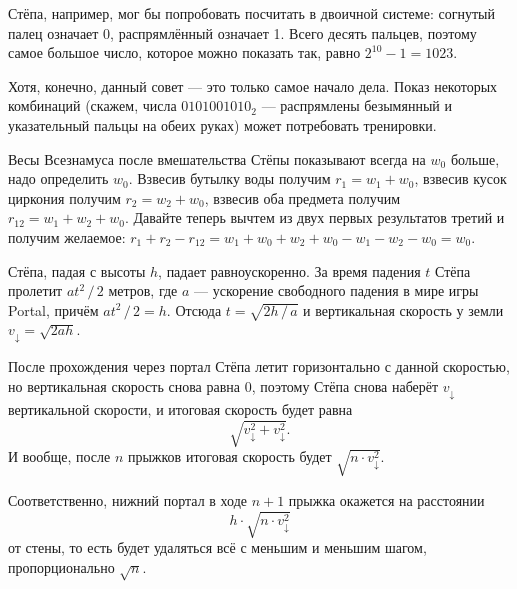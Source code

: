 \begin{itemize}
\itA Стёпа, например, мог бы попробовать посчитать в двоичной системе:
согнутый палец означает 0, распрямлённый означает 1. Всего десять пальцев,
поэтому самое большое число, которое можно показать так, равно $2^{10}-1 = 1023$.

Хотя, конечно, данный совет --- это только самое начало дела. Показ некоторых
комбинаций (скажем, числа $0101001010_2$ --- распрямлены безымянный и указательный
пальцы на обеих руках) может потребовать тренировки.


\itB Весы Всезнамуса после вмешательства Стёпы показывают всегда на $w_0$ больше, надо определить $w_0$.
Взвесив бутылку воды получим $r_1 = w_1 + w_0$, взвесив кусок циркония получим $r_2 = w_2 + w_0$,
взвесив оба предмета получим $r_{12} = w_1 + w_2 + w_0$. Давайте теперь вычтем из двух 
первых результатов третий и получим желаемое: 
$r_1 + r_2 - r_{12} = w_1 + w_0 + w_2 + w_0 - w_1 - w_2 - w_0 = w_0$.

\itC Стёпа, падая с высоты $h$, падает равноускоренно. За время падения $t$ Стёпа пролетит 
$at^2\,/\,2$ метров, где $a$ --- ускорение свободного падения в мире игры Portal, 
причём $at^2\,/\,2 = h$. Отсюда $t = \sqrt{2h\,/\,a}$ и вертикальная скорость
у земли $v_\downarrow = \sqrt{2ah}$.

После прохождения через портал Стёпа летит горизонтально с данной скоростью, но вертикальная
скорость снова равна 0, поэтому Стёпа снова наберёт $v_\downarrow$ вертикальной скорости, и
итоговая скорость будет равна
	$$\sqrt{v_\downarrow^2 + v_\downarrow^2}.$$
И вообще, после $n$ прыжков итоговая скорость будет $\sqrt{n \cdot v_\downarrow^2}$.

Соответственно, нижний портал в ходе $n+1$ прыжка окажется на расстоянии 
	$$h \cdot \sqrt{n \cdot v_\downarrow^2}$$
от стены, то есть будет удаляться всё с меньшим и меньшим шагом,
пропорционально $\sqrt{n}$.

\end{itemize}
